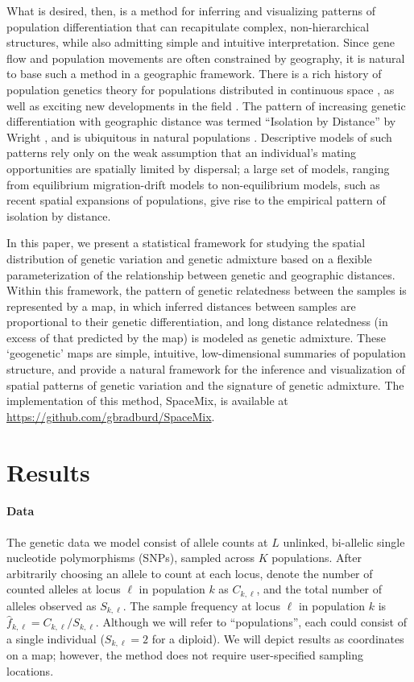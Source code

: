 \documentclass[10pt,letterpaper]{article}
\begin{document}
What is desired, then, is a method for inferring and visualizing patterns of population differentiation that can recapitulate complex, non-hierarchical structures, while also admitting simple and intuitive interpretation.  
Since gene flow and population movements are often constrained by geography,
it is natural to base such a method in a geographic framework.
There is a rich history of population genetics theory for populations distributed in continuous space \cite{Malecot1975, nagylaki1978diffusion, felsensten1975pain, barton-depaulis-etheridge}, as well as exciting new developments in the field \cite{Petkova_2014_EEMS}.
The pattern of increasing genetic differentiation with geographic distance 
was termed ``Isolation by Distance'' by Wright \cite{Wright1943},
and is ubiquitous in natural populations \cite{meirmans2012}.
Descriptive models of such patterns rely only on the weak assumption that an individual's mating opportunities are spatially limited by dispersal; 
a large set of models, ranging from equilibrium migration-drift models to non-equilibrium models, such as recent spatial expansions of populations, 
give rise to the empirical pattern of isolation by distance.

In this paper, we present a statistical framework for studying the spatial distribution of genetic variation and genetic admixture based on a flexible parameterization
of the relationship between genetic and geographic distances.
Within this framework, the pattern of genetic relatedness between the samples is represented by a map, 
in which inferred distances between samples are proportional to their genetic differentiation, 
and long distance relatedness (in excess of that predicted by the map) is modeled as genetic admixture.
These `geogenetic'  maps are simple, intuitive, low-dimensional summaries of population structure, 
and provide a natural framework for the inference and visualization of spatial patterns of genetic variation and the signature of genetic admixture.  
The implementation of this method, SpaceMix, is available at \href{https://github.com/gbradburd/SpaceMix}{https://github.com/gbradburd/SpaceMix}.

\section*{Results}
\paragraph{Data}
The genetic data we model consist of allele counts
at $L$ unlinked, bi-allelic single nucleotide polymorphisms (SNPs), sampled across $K$ populations.
After arbitrarily choosing an allele to count at each locus, 
denote the number of counted alleles at locus $\ell$ in population $k$ as $C_{k,\ell}$,
and the total number of alleles observed as $S_{k,\ell}$.
The sample frequency at locus $\ell$ in population $k$ is $\hat{f}_{k,\ell} = C_{k,\ell}/S_{k,\ell}$.  
Although we will refer to ``populations'', each could consist of a single individual ($S_{k,\ell}=2$ for a diploid).
We will depict results as coordinates on a map; however, the method does not require user-specified sampling locations.
\end{document}
